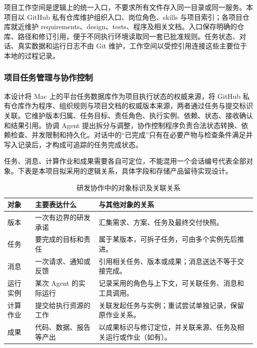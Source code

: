 \documentclass[11pt,a4paper]{article}
\begin{document}
项目工作空间是逻辑上的统一入口，不要求所有文件存入同一目录或同一服务。本项目以 GitHub 私有仓库维护组织入口、岗位角色、skills 与项目索引；各项目仓库就近维护 requirements、design、tests、程序及相关文档。入口保存明确的仓库、路径和修订引用，便于不同执行环境读取同一套已批准规则。任务状态、对话、真实数据和运行日志不由 Git 维护，工作空间以受控引用连接这些主要位于本地的过程记录。

\subsubsection{项目任务管理与协作控制}

本设计将 Mac 上的平台任务数据库作为项目执行状态的权威来源，将 GitHub 私有仓库作为程序、组织规则与项目文档的权威版本来源，两者通过任务与提交标识关联。它维护版本归属、任务目标、责任角色、执行实例、依赖、状态、接收确认和结果引用。协调 Agent 提出拆分与调整，协作控制程序负责合法状态转换、依赖检查、并发限制和持久化。对话中的“已完成”只有在必要产物与检查条件满足并写入记录后，才构成可追踪的任务完成状态。

任务、消息、计算作业和成果需要各自可定位，不能混用一个会话编号代表全部对象。下表是本项目拟采用的逻辑关系，具体字段和存储产品留待实现设计。

\begin{table}[htbp]
\centering\small\renewcommand{\arraystretch}{1.2}
\begin{tabularx}{\textwidth}{P{1.75cm}P{3.4cm}L}
\toprule
\textbf{对象} & \textbf{主要表达什么} & \textbf{与其他对象的关系}\\
\midrule
版本 & 一次有边界的研发承诺 & 汇集需求、方案、任务及最终交付快照。\\
任务 & 要完成的目标和责任 & 属于某版本，可拆子任务，可由多个实例先后推进。\\
消息 & 一次请求、通知或反馈 & 引用相关任务、版本或成果；消息送达不等于交接完成。\\
运行实例 & 某次 Agent 的实际运行 & 记录采用的角色与上下文，可关联任务、消息和工具调用。\\
计算作业 & 提交给执行资源的工作 & 关联发起任务与实例；重试尝试单独记录，保留原作业关系。\\
成果 & 代码、数据、报告等产出 & 以成果标识与修订定位，并关联来源、任务及相关运行或作业（如有）。\\
\bottomrule
\end{tabularx}
\caption{研发协作中的对象标识及关联关系}
\end{table}
\end{document}
